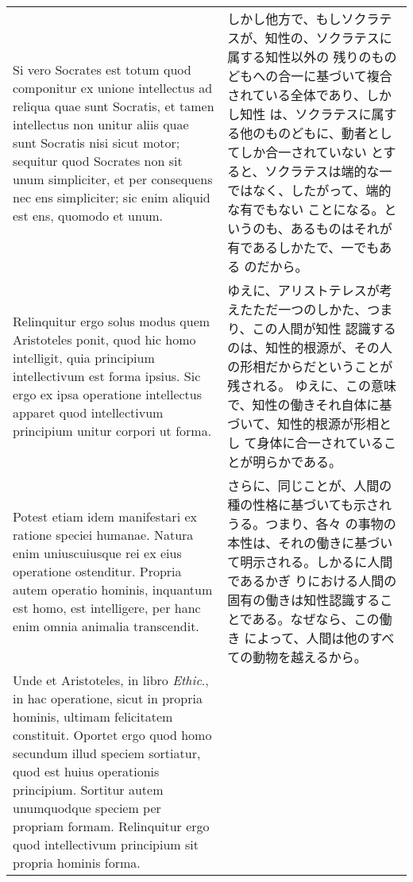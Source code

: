 \documentclass[paper=a4paper,fontsize=10pt,jafontsize=9pt,titlepage]{jlreq}
\begin{document}
\begin{longtable}{p{21em}p{21em}}
\\


Si vero Socrates est totum quod componitur ex unione intellectus ad
 reliqua quae sunt Socratis, et tamen intellectus non unitur aliis
 quae sunt Socratis nisi sicut motor; sequitur quod Socrates non sit
 unum simpliciter, et per consequens nec ens simpliciter; sic enim
 aliquid est ens, quomodo et unum.

 &

 しかし他方で、もしソクラテスが、知性の、ソクラテスに属する知性以外の
 残りのものどもへの合一に基づいて複合されている全体であり、しかし知性
 は、ソクラテスに属する他のものどもに、動者としてしか合一されていない
 とすると、ソクラテスは端的な一ではなく、したがって、端的な有でもない
 ことになる。というのも、あるものはそれが有であるしかたで、一でもある
 のだから。


 \\

 
 Relinquitur ergo solus modus quem Aristoteles ponit, quod hic homo
 intelligit, quia principium intellectivum est forma ipsius. Sic ergo
 ex ipsa operatione intellectus apparet quod intellectivum principium
 unitur corpori ut forma.
 
&

ゆえに、アリストテレスが考えたただ一つのしかた、つまり、この人間が知性
認識するのは、知性的根源が、その人の形相だからだということが残される。
ゆえに、この意味で、知性の働きそれ自体に基づいて、知性的根源が形相とし
て身体に合一されていることが明らかである。
 
\\


 Potest etiam idem manifestari ex ratione speciei humanae. Natura enim
 uniuscuiusque rei ex eius operatione ostenditur. Propria autem
 operatio hominis, inquantum est homo, est intelligere, per hanc enim
 omnia animalia transcendit.
 
&

さらに、同じことが、人間の種の性格に基づいても示されうる。つまり、各々
の事物の本性は、それの働きに基づいて明示される。しかるに人間であるかぎ
りにおける人間の固有の働きは知性認識することである。なぜなら、この働き
によって、人間は他のすべての動物を越えるから。

 
\\


 Unde et Aristoteles, in libro {\itshape Ethic}., in hac operatione,
 sicut in propria hominis, ultimam felicitatem constituit. Oportet
 ergo quod homo secundum illud speciem sortiatur, quod est huius
 operationis principium. Sortitur autem unumquodque speciem per
 propriam formam. Relinquitur ergo quod intellectivum principium sit
 propria hominis forma.
 

\end{longtable}
\end{document}
